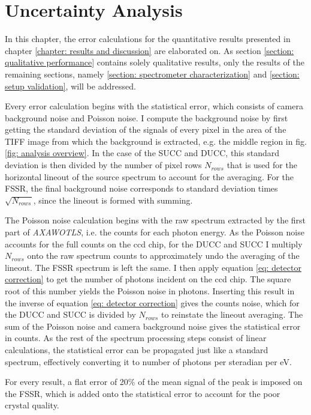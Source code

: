 \chapter{Uncertainty Analysis}
\label{chapter: uncertainty analysis}

In this chapter, the error calculations for the quantitative results presented in chapter \ref{chapter: results and discussion} are elaborated on. As section \ref{section: qualitative performance} contains solely qualitative results, only the results of the remaining sections, namely \ref{section: spectrometer characterization} and \ref{section: setup validation}, will be addressed. 

Every error calculation begins with the statistical error, which consists of camera background noise and Poisson noise. I compute the background noise by first getting the standard deviation of the signals of every pixel in the area of the TIFF image from which the background is extracted, e.g. the middle region in fig. \ref{fig: analysis overview}. In the case of the SUCC and DUCC, this standard deviation is then divided by the number of pixel rows $N_{rows}$ that is used for the horizontal lineout of the source spectrum to account for the averaging. For the FSSR, the final background noise corresponds to standard deviation times $\sqrt{N_{rows}}$, since the lineout is formed with summing.

The Poisson noise calculation begins with the raw spectrum extracted by the first part of \textit{AXAWOTLS}, i.e. the counts for each photon energy. As the Poisson noise accounts for the full counts on the ccd chip, for the DUCC and SUCC I multiply $N_{rows}$ onto the raw spectrum counts to approximately undo the averaging of the lineout. The FSSR spectrum is left the same. I then apply equation \ref{eq: detector correction} to get the number of photons incident on the ccd chip. The square root of this number yields the Poisson noise in photons. Inserting this result in the inverse of equation \ref{eq: detector correction} gives the counts noise, which for the DUCC and SUCC is divided by $N_{rows}$ to reinstate the lineout averaging. The sum of the Poisson noise and camera background noise gives the statistical error in counts. As the rest of the spectrum processing steps consist of linear calculations, the statistical error can be propagated just like a standard spectrum, effectively converting it to number of photons per steradian per eV.

For every result, a flat error of 20\% of the mean signal of the peak is imposed on the FSSR, which is added onto the statistical error to account for the poor crystal quality.

